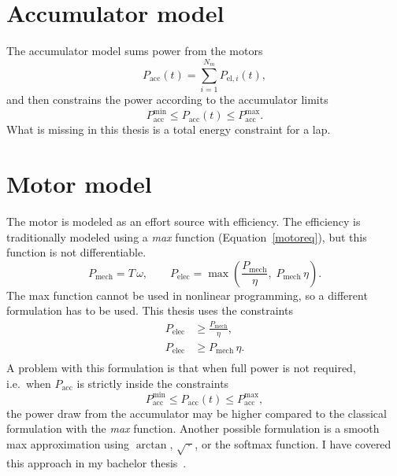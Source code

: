 \section{Accumulator model}
The accumulator model sums power from the motors
\begin{equation}
P_{\mathrm{acc}}(t) = \sum_{i=1}^{N_m} P_{\mathrm{el},i}(t),
\end{equation}
and then constrains the power according to the accumulator limits
\begin{equation}
P_{\mathrm{acc}}^{\min} \le P_{\mathrm{acc}}(t) \le P_{\mathrm{acc}}^{\max}.
\end{equation}
What is missing in this thesis is a total energy constraint for a lap.
\section{Motor model}
\label{motormodel}
The motor is modeled as an effort source with efficiency. The efficiency is traditionally modeled using a \emph{max} function (Equation~\ref{motoreq}), but this function is not differentiable.
\begin{equation}
    P_\text{mech} = T\,\omega, \qquad
    P_\text{elec} = \max\!\left(\frac{P_\text{mech}}{\eta},\; P_\text{mech}\,\eta\right).
    \label{motoreq}
\end{equation}
The max function cannot be used in nonlinear programming, so a different formulation has to be used.
This thesis uses the constraints
\begin{equation}
    \begin{aligned}
        P_\text{elec} &\geq \frac{P_\text{mech}}{\eta}, \\
        P_\text{elec} &\geq {P_\text{mech}\, \eta}. \\
    \end{aligned}
    \label{motoreq2}
\end{equation}
A problem with this formulation is that when full power is not required, i.e.\ when $P_{\mathrm{acc}}$ is strictly inside the constraints
\begin{equation}
P_{\mathrm{acc}}^{\min} \le P_{\mathrm{acc}}(t) \le P_{\mathrm{acc}}^{\max},
\end{equation}
the power draw from the accumulator may be higher compared to the classical formulation with the \emph{max} function.
Another possible formulation is a smooth max approximation using $\arctan$, $\sqrt{\,\cdot\,}$, or the softmax function. I have covered this approach in my bachelor thesis~\cite{ciglanskyAnalysisVehicleComponents}.
